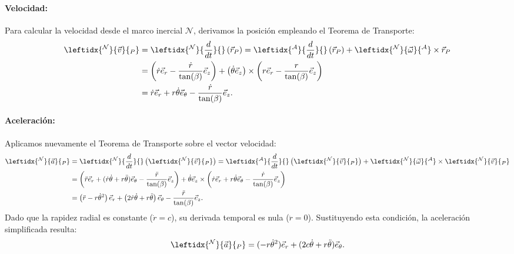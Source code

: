 \begin{tcolorbox}[title=Arbol de Navidad(pero sin condicion de R y $\theta$),breakable]
\paragraph{Velocidad:} Para calcular la velocidad desde el marco inercial $\mathcal{N}$, derivamos la posición empleando el Teorema de Transporte:
\begin{align*}
    \leftidx{^{\mathcal{N}}}{\vec{v}}{_P} &= \leftidx{^{\mathcal{N}}}{\frac{d}{dt}}{} \left( \vec{r}_P \right) = \leftidx{^{\mathcal{A}}}{\frac{d}{dt}}{} \left( \vec{r}_P \right) + \leftidx{^{\mathcal{N}}}{\vec{\omega}}{^{\mathcal{A}}} \times \vec{r}_P \\
    &= \left( \dot{r}\vec{e}_{r} - \frac{\dot{r}}{\tan(\beta)} \vec{e}_z \right) + \left( \dot{\theta} \vec{e}_z \right) \times \left( r\vec{e}_{r} - \frac{r}{\tan(\beta)} \vec{e}_z \right) \\
    &= \dot{r}\vec{e}_{r} + r\dot{\theta} \vec{e}_{\theta} - \frac{\dot{r}}{\tan(\beta)} \vec{e}_z.
\end{align*}

\paragraph{Aceleración:} Aplicamos nuevamente el Teorema de Transporte sobre el vector velocidad:
\begin{align*}
    \leftidx{^{\mathcal{N}}}{\vec{a}}{_P} &= \leftidx{^{\mathcal{N}}}{\frac{d}{dt}}{} \left( \leftidx{^{\mathcal{N}}}{\vec{v}}{_P} \right) = \leftidx{^{\mathcal{A}}}{\frac{d}{dt}}{} \left( \leftidx{^{\mathcal{N}}}{\vec{v}}{_P} \right) + \leftidx{^{\mathcal{N}}}{\vec{\omega}}{^{\mathcal{A}}} \times \leftidx{^{\mathcal{N}}}{\vec{v}}{_P} \\
    &= \left( \ddot{r}\vec{e}_{r} + (\dot{r}\dot{\theta} + r\ddot{\theta})\vec{e}_{\theta} - \frac{\ddot{r}}{\tan(\beta)}\vec{e}_z \right) + \dot{\theta}\vec{e}_z \times \left( \dot{r}\vec{e}_{r} + r\dot{\theta}\vec{e}_{\theta} - \frac{\dot{r}}{\tan(\beta)}\vec{e}_z \right) \\
    &= \left( \ddot{r} - r\dot{\theta}^2 \right)\vec{e}_r + \left( 2\dot{r}\dot{\theta} + r\ddot{\theta} \right)\vec{e}_{\theta} - \frac{\ddot{r}}{\tan(\beta)}\vec{e}_z.
\end{align*}
Dado que la rapidez radial es constante ($\dot{r} = c$), su derivada temporal es nula ($\ddot{r} = 0$). Sustituyendo esta condición, la aceleración simplificada resulta:
\[
    \leftidx{^{\mathcal{N}}}{\vec{a}}{_P} = (-r\dot{\theta}^2)\vec{e}_r + (2c\dot{\theta} + r\ddot{\theta})\vec{e}_{\theta}.
\]


\end{tcolorbox}
